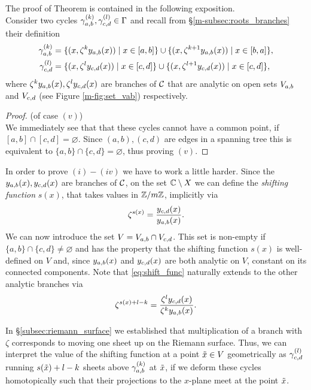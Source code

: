 \documentclass[main.tex]{subfiles}
\begin{document}
 \bigskip
 The proof of Theorem is contained in the following exposition. \\ 
  Consider
  two cycles $\gamma_{a,b}^{(k)},\gamma_{c,d}^{(l)} \in \Gamma$ and
  recall from \S \ref{m-subsec:roots_branches} their definition 
   \begin{align}\label{eq:def_cyabk}
      \gamma_{a,b}^{(k)} & = \{  (x,\zeta^k y_{a,b}(x))  \mid  x \in [a,b]  \} \cup \{  (x,\zeta^{k+1} y_{a,b}(x))  \mid  x \in [b,a]  \}, \\
      \gamma_{c,d}^{(l)} & = \{  (x,\zeta^l y_{c,d}(x))  \mid  x \in [c,d]  \} \cup \{  (x,\zeta^{l+1} y_{c,d}(x))  \mid  x \in [c,d]  \},
   \end{align}
  where $\zeta^ky_{a,b}(x),\zeta^ly_{c,d}(x)$ are branches of $\mathcal{C}$ that are analytic on open sets $V_{a,b}$ and $V_{c,d}$ 
  (see Figure \ref{m-fig:set_vab}) respectively.
  \begin{proof}\let\qed\relax (of case $(v)$) \\
  We immediately see that that these cycles cannot have a common point, if $[a,b] \cap [c,d] = \varnothing$. Since
  $(a,b),(c,d)$ are edges in a spanning tree this is equivalent to $\{a,b\} \cap \{c,d\} = \varnothing$, thus
  proving $(v)$.
  \end{proof}
   In order to prove $(i)-(iv)$ we have to work a little harder.  Since the $y_{a,b}(x),y_{c,d}(x)$ are branches of $\mathcal{C}$,
   on the set $\mathbb{C} \setminus X$
   we can define the \emph{shifting function}
   $s(x)$, that takes values in $\mathbb{Z}/m\mathbb{Z}$, implicitly via
  \begin{equation}\label{eq:shift_func}
   \zeta^{s(x)} = \frac{y_{c,d}(x)}{y_{a,b}(x)}.
   \end{equation}
  We can now introduce the set $V = V_{a,b} \cap V_{c,d}$. This set is non-empty if  $\{a,b\} \cap \{c,d\} \ne \varnothing$
  and has the property that the shifting function $s(x)$ is well-defined on $V$ and, since $y_{a,b}(x)$ and $y_{c,d}(x)$ are 
  both analytic on $V$, constant on its 
  connected components.
  Note that \eqref{eq:shift_func} naturally extends to the other analytic branches via
  \begin{equation}
   \zeta^{s(x)+l-k} = \frac{\zeta^ly_{c,d}(x)}{\zeta^ky_{a,b}(x)}.
   \end{equation}
  
  In \S \ref{subsec:riemann_surface} we established that multiplication of a branch with $\zeta$ corresponds to moving
  one sheet up on the Riemann surface. Thus, 
  we can interpret the value of the shifting function at a point $\tilde{x} \in V$ geometrically as
  $\gamma_{c,d}^{(l)}$ running $s(\tilde{x})+l-k$ sheets above $\gamma_{a,b}^{(k)}$ at $\tilde{x}$, if we deform these cycles homotopically such that their
  projections to the $x$-plane meet at the point $\tilde{x}$.
  
\end{document}
